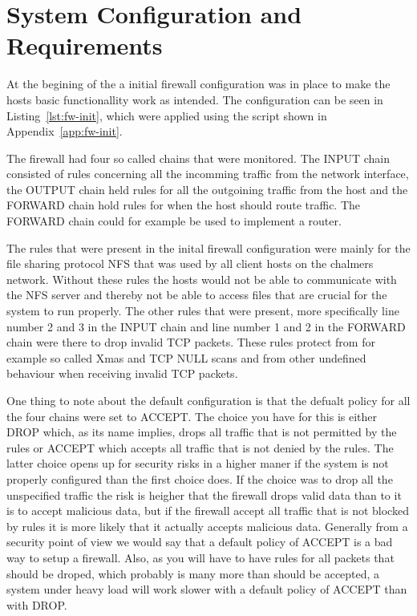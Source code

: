 \section{System Configuration and Requirements}
\label{sec:setup}

At the begining of the \lab a initial firewall configuration was in place to make the hosts basic functionallity work as intended. The configuration can be seen in Listing~\ref{lst:fw-init}, which were applied using the script shown in Appendix~\ref{app:fw-init}. 

The firewall had four so called chains that were monitored. The INPUT chain consisted of rules concerning all the incomming traffic from the network interface, the OUTPUT chain held rules for all the outgoining traffic from the host and the FORWARD chain hold rules for when the host should route traffic. The FORWARD chain could for example be used to implement a router.

The rules that were present in the inital firewall configuration were mainly for the file sharing protocol NFS that was used by all client hosts on the chalmers network. Without these rules the hosts would not be able to communicate with the NFS server and thereby not be able to access files that are crucial for the system to run properly. The other rules that were present, more specifically line number 2 and 3 in the INPUT chain and line number 1 and 2 in the FORWARD chain were there to drop invalid TCP packets. These rules protect from for example so called Xmas and TCP NULL scans and from other undefined behaviour when receiving invalid TCP packets.

One thing to note about the default configuration is that the defualt policy for all the four chains were set to ACCEPT. The choice you have for this is either DROP which, as its name implies, drops all traffic that is not permitted by the rules or ACCEPT which accepts all traffic that is not denied by the rules. The latter choice opens up for security risks in a higher maner if the system is not properly configured than the first choice does. If the choice was to drop all the unspecified traffic the risk is heigher that the firewall drops valid data than to it is to accept malicious data, but if the firewall accept all traffic that is not blocked by rules it is more likely that it actually accepts malicious data. Generally from a security point of view we would say that a default policy of ACCEPT is a bad way to setup a firewall. Also, as you will have to have rules for all packets that should be droped, which probably is many more than should be accepted, a system under heavy load will work slower with a default policy of ACCEPT than with DROP.




